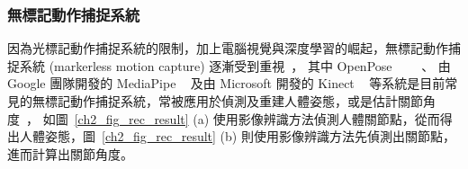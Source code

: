 \subsubsection{無標記動作捕捉系統}
因為光標記動作捕捉系統的限制，加上電腦視覺與深度學習的崛起，無標記動作捕捉系統 (markerless motion capture) 逐漸受到重視~\cite{sarafianos20163d}，
其中 OpenPose ~\cite{8765346}~\cite{wei2016cpm}~\cite{simon2017hand}~\cite{cao2017realtime}、
由 Google 團隊開發的 MediaPipe ~\cite{mediapipe_web} 及由 Microsoft 開發的 Kinect ~\cite{zhang2012microsoft} 等系統是目前常見的無標記動作捕捉系統，常被應用於偵測及重建人體姿態，或是估計關節角度~\cite{LATRECHE2023112826}，
如圖~\ref{ch2_fig_rec_result} (a) 使用影像辨識方法偵測人體關節點，從而得出人體姿態，圖~\ref{ch2_fig_rec_result} (b) 則使用影像辨識方法先偵測出關節點，進而計算出關節角度。

